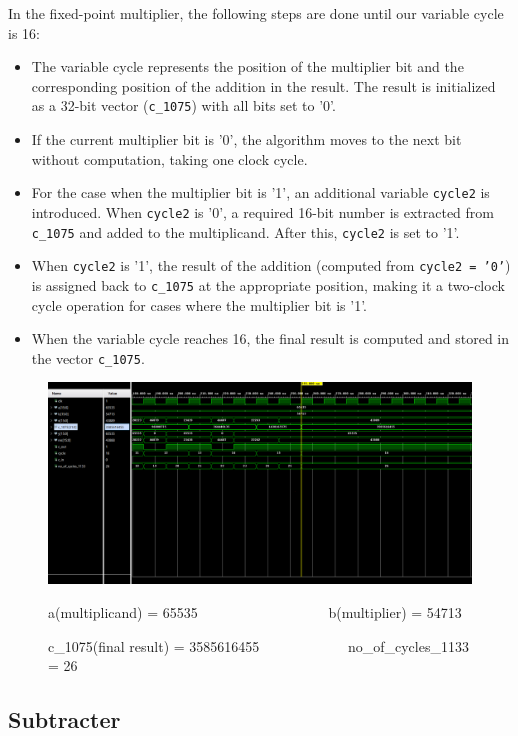 \documentclass[11pt]{article}
\begin{document}
In the fixed-point multiplier, the following steps are done until our variable cycle is 16:

\begin{itemize}
    \item The variable cycle represents the position of the multiplier bit and the corresponding position of the addition in the result. The result is initialized as a 32-bit vector (\texttt{c\_1075}) with all bits set to '0'.
    \item If the current multiplier bit is '0', the algorithm moves to the next bit without computation, taking one clock cycle.
    \item For the case when the multiplier bit is '1', an additional variable \texttt{cycle2} is introduced. When \texttt{cycle2} is '0', a required 16-bit number is extracted from \texttt{c\_1075} and added to the multiplicand. After this, \texttt{cycle2} is set to '1'.
    \item When \texttt{cycle2} is '1', the result of the addition (computed from \texttt{cycle2 = '0'}) is assigned back to \texttt{c\_1075} at the appropriate position, making it a two-clock cycle operation for cases where the multiplier bit is '1'.
    \item When the variable cycle reaches 16, the final result is computed and stored in the vector \texttt{c\_1075}.
\end{itemize}

\begin{figure}[H]
  \centering
  \includegraphics[width=1\textwidth]{img1.png}
  \captionsetup{labelformat=empty}
  \caption{a(multiplicand) = 65535 \ \ \ \ \ \ \ \ \ \ \ \ \ \ \ \ \ \ b(multiplier) = 54713 }
  \caption{c\_1075(final result) = 3585616455 \ \ \ \ \ \ \ \ \ \ \ \ no\_of\_cycles\_1133 = 26 \ \ \ \ \ \ \ } 
\end{figure}

\subsection{Subtracter}
\end{document}
